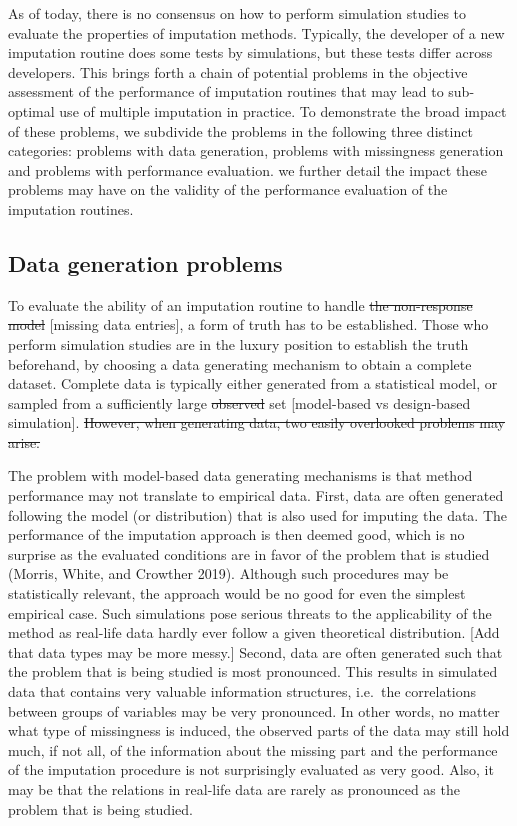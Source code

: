 \documentclass[
]{article}
\begin{document}
As of today, there is no consensus on how to perform simulation studies
to evaluate the properties of imputation methods. Typically, the
developer of a new imputation routine does some tests by simulations,
but these tests differ across developers. This brings forth a chain of
potential problems in the objective assessment of the performance of
imputation routines that may lead to sub-optimal use of multiple
imputation in practice. To demonstrate the broad impact of these
problems, we subdivide the problems in the following three distinct
categories: problems with data generation, problems with missingness
generation and problems with performance evaluation. we further detail
the impact these problems may have on the validity of the performance
evaluation of the imputation routines.

\hypertarget{data-generation-problems}{%
\subsection{Data generation problems}\label{data-generation-problems}}

To evaluate the ability of an imputation routine to handle \sout{the
non-response model} {[}missing data entries{]}, a form of truth has to
be established. Those who perform simulation studies are in the luxury
position to establish the truth beforehand, by choosing a data
generating mechanism to obtain a complete dataset. Complete data is
typically either generated from a statistical model, or sampled from a
sufficiently large \sout{observed} set {[}model-based vs design-based
simulation{]}. \sout{However, when generating data, two easily
overlooked problems may arise.}

The problem with model-based data generating mechanisms is that method
performance may not translate to empirical data. First, data are often
generated following the model (or distribution) that is also used for
imputing the data. The performance of the imputation approach is then
deemed good, which is no surprise as the evaluated conditions are in
favor of the problem that is studied (Morris, White, and Crowther 2019).
Although such procedures may be statistically relevant, the approach
would be no good for even the simplest empirical case. Such simulations
pose serious threats to the applicability of the method as real-life
data hardly ever follow a given theoretical distribution. {[}Add that
data types may be more messy.{]} Second, data are often generated such
that the problem that is being studied is most pronounced. This results
in simulated data that contains very valuable information structures,
i.e.~the correlations between groups of variables may be very
pronounced. In other words, no matter what type of missingness is
induced, the observed parts of the data may still hold much, if not all,
of the information about the missing part and the performance of the
imputation procedure is not surprisingly evaluated as very good. Also,
it may be that the relations in real-life data are rarely as pronounced
as the problem that is being studied.
\end{document}
